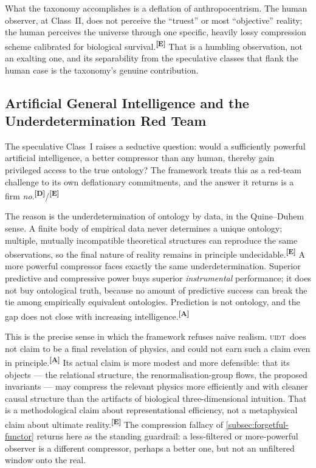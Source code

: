 \documentclass[12pt,a4paper,twoside]{article}
\theoremstyle{plain}
\theoremstyle{definition}
\theoremstyle{remark}
\newcommand{\UIDT}{\textsc{uidt}}
\newcommand{\catmark}[1]{\textsuperscript{\textsf{\textbf{[#1]}}}}
\begin{document}
What the taxonomy accomplishes is a deflation of anthropocentrism. The
human observer, at Class~II, does not perceive the ``truest'' or most
``objective'' reality; the human perceives the universe through one
specific, heavily lossy compression scheme calibrated for biological
survival.\catmark{E} That is a humbling observation, not an exalting one,
and its separability from the speculative classes that flank the human case
is the taxonomy's genuine contribution.

\subsection{Artificial General Intelligence and the Underdetermination Red Team}
\label{subsec:agi-underdetermination}

The speculative Class~I raises a seductive question: would a sufficiently
powerful artificial intelligence, a better compressor than any human,
thereby gain privileged access to the true ontology? The framework treats
this as a red-team challenge to its own deflationary commitments, and the
answer it returns is a firm \emph{no}.\catmark{D}/\catmark{E}

The reason is the underdetermination of ontology by data, in the
Quine--Duhem sense. A finite body of empirical data never determines a
unique ontology; multiple, mutually incompatible theoretical structures can
reproduce the same observations, so the final nature of reality remains in
principle undecidable.\catmark{E} A more powerful compressor faces exactly
the same underdetermination. Superior predictive and compressive power buys
superior \emph{instrumental} performance; it does not buy ontological
truth, because no amount of predictive success can break the tie among
empirically equivalent ontologies. Prediction is not ontology, and the gap
does not close with increasing intelligence.\catmark{A}

This is the precise sense in which the framework refuses naive realism.
\UIDT\ does not claim to be a final revelation of physics, and could not
earn such a claim even in principle.\catmark{A} Its actual claim is more
modest and more defensible: that its objects --- the relational structure,
the renormalisation-group flows, the proposed invariants --- may compress
the relevant physics more efficiently and with cleaner causal structure
than the artifacts of biological three-dimensional intuition. That is a
methodological claim about representational efficiency, not a metaphysical
claim about ultimate reality.\catmark{E} The compression fallacy of
\cref{subsec:forgetful-functor} returns here as the standing guardrail: a
less-filtered or more-powerful observer is a different compressor, perhaps
a better one, but not an unfiltered window onto the real.
\end{document}
